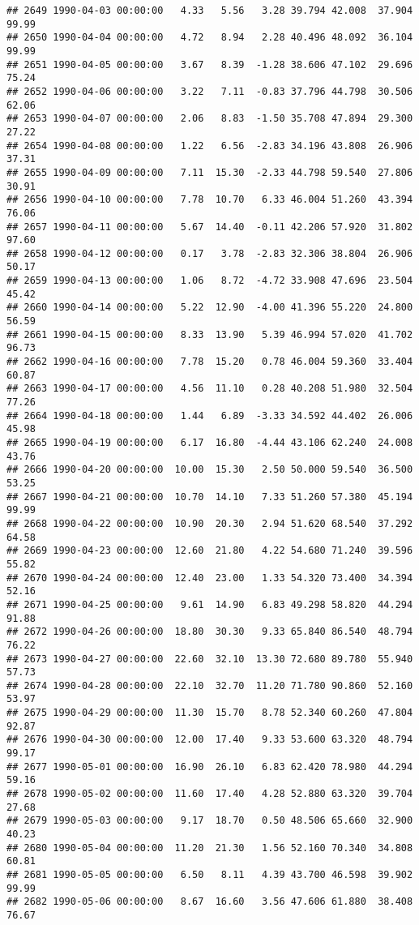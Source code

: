 \documentclass{article}\usepackage{graphicx, color}
\makeatletter
\newenvironment{kframe}{%
 \def\at@end@of@kframe{}%
 \ifinner\ifhmode%
  \def\at@end@of@kframe{\end{minipage}}%
  \begin{minipage}{\columnwidth}%
 \fi\fi%
 \def\FrameCommand##1{\hskip\@totalleftmargin \hskip-\fboxsep
 \colorbox{shadecolor}{##1}\hskip-\fboxsep
     \hskip-\linewidth \hskip-\@totalleftmargin \hskip\columnwidth}%
 \MakeFramed {\advance\hsize-\width
   \@totalleftmargin\z@ \linewidth\hsize
   \@setminipage}}%
 {\par\unskip\endMakeFramed%
 \at@end@of@kframe}
\newenvironment{knitrout}{}{} %
\makeatother
\begin{document}
\begin{knitrout}
\begin{kframe}
\begin{verbatim}
## 2649 1990-04-03 00:00:00   4.33   5.56   3.28 39.794 42.008  37.904  99.99
## 2650 1990-04-04 00:00:00   4.72   8.94   2.28 40.496 48.092  36.104  99.99
## 2651 1990-04-05 00:00:00   3.67   8.39  -1.28 38.606 47.102  29.696  75.24
## 2652 1990-04-06 00:00:00   3.22   7.11  -0.83 37.796 44.798  30.506  62.06
## 2653 1990-04-07 00:00:00   2.06   8.83  -1.50 35.708 47.894  29.300  27.22
## 2654 1990-04-08 00:00:00   1.22   6.56  -2.83 34.196 43.808  26.906  37.31
## 2655 1990-04-09 00:00:00   7.11  15.30  -2.33 44.798 59.540  27.806  30.91
## 2656 1990-04-10 00:00:00   7.78  10.70   6.33 46.004 51.260  43.394  76.06
## 2657 1990-04-11 00:00:00   5.67  14.40  -0.11 42.206 57.920  31.802  97.60
## 2658 1990-04-12 00:00:00   0.17   3.78  -2.83 32.306 38.804  26.906  50.17
## 2659 1990-04-13 00:00:00   1.06   8.72  -4.72 33.908 47.696  23.504  45.42
## 2660 1990-04-14 00:00:00   5.22  12.90  -4.00 41.396 55.220  24.800  56.59
## 2661 1990-04-15 00:00:00   8.33  13.90   5.39 46.994 57.020  41.702  96.73
## 2662 1990-04-16 00:00:00   7.78  15.20   0.78 46.004 59.360  33.404  60.87
## 2663 1990-04-17 00:00:00   4.56  11.10   0.28 40.208 51.980  32.504  77.26
## 2664 1990-04-18 00:00:00   1.44   6.89  -3.33 34.592 44.402  26.006  45.98
## 2665 1990-04-19 00:00:00   6.17  16.80  -4.44 43.106 62.240  24.008  43.76
## 2666 1990-04-20 00:00:00  10.00  15.30   2.50 50.000 59.540  36.500  53.25
## 2667 1990-04-21 00:00:00  10.70  14.10   7.33 51.260 57.380  45.194  99.99
## 2668 1990-04-22 00:00:00  10.90  20.30   2.94 51.620 68.540  37.292  64.58
## 2669 1990-04-23 00:00:00  12.60  21.80   4.22 54.680 71.240  39.596  55.82
## 2670 1990-04-24 00:00:00  12.40  23.00   1.33 54.320 73.400  34.394  52.16
## 2671 1990-04-25 00:00:00   9.61  14.90   6.83 49.298 58.820  44.294  91.88
## 2672 1990-04-26 00:00:00  18.80  30.30   9.33 65.840 86.540  48.794  76.22
## 2673 1990-04-27 00:00:00  22.60  32.10  13.30 72.680 89.780  55.940  57.73
## 2674 1990-04-28 00:00:00  22.10  32.70  11.20 71.780 90.860  52.160  53.97
## 2675 1990-04-29 00:00:00  11.30  15.70   8.78 52.340 60.260  47.804  92.87
## 2676 1990-04-30 00:00:00  12.00  17.40   9.33 53.600 63.320  48.794  99.17
## 2677 1990-05-01 00:00:00  16.90  26.10   6.83 62.420 78.980  44.294  59.16
## 2678 1990-05-02 00:00:00  11.60  17.40   4.28 52.880 63.320  39.704  27.68
## 2679 1990-05-03 00:00:00   9.17  18.70   0.50 48.506 65.660  32.900  40.23
## 2680 1990-05-04 00:00:00  11.20  21.30   1.56 52.160 70.340  34.808  60.81
## 2681 1990-05-05 00:00:00   6.50   8.11   4.39 43.700 46.598  39.902  99.99
## 2682 1990-05-06 00:00:00   8.67  16.60   3.56 47.606 61.880  38.408  76.67

\end{verbatim}
\end{kframe}
\end{knitrout}
\end{document}
